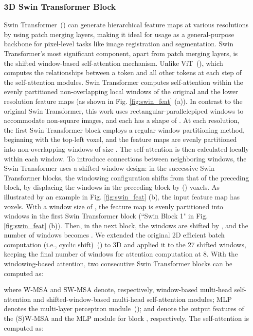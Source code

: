 \documentclass[times,twocolumn,final]{elsarticle}
\begin{document}
\subsubsection{3D Swin Transformer Block}
Swin Transformer~(\cite{liu2021swin}) can generate hierarchical feature maps at various resolutions by using patch merging layers, making it ideal for usage as a general-purpose backbone for pixel-level tasks like image registration and segmentation. Swin Transformer's most significant component, apart from patch merging layers, is the shifted window-based self-attention mechanism. Unlike ViT~(\cite{dosovitskiy2020image}), which computes the relationships between a token and all other tokens at each step of the self-attention modules. Swin Transformer computes self-attention within the evenly partitioned non-overlapping local windows of the original and the lower resolution feature maps (as shown in Fig. \ref{fig:swin_feat} (a)). In contrast to the original Swin Transformer, this work uses rectangular-parallelepiped windows to accommodate non-square images, and each has a shape of . At each resolution, the first Swin Transformer block employs a regular window partitioning method, beginning with the top-left voxel, and the feature maps are evenly partitioned into non-overlapping windows of size . The self-attention is then calculated locally within each window. To introduce connections between neighboring windows, the Swin Transformer uses a shifted window design: in the successive Swin Transformer blocks, the windowing configuration shifts from that of the preceding block, by displacing the windows in the preceding block by () voxels. As illustrated by an example in Fig. \ref{fig:swin_feat} (b), the input feature map has  voxels. With a window size of , the feature map is evenly partitioned into  windows in the first Swin Transformer block (``Swin Block 1" in Fig. \ref{fig:swin_feat} (b)). Then, in the next block, the windows are shifted by , and the number of windows becomes . We extended the original 2D efficient batch computation (i.e., cyclic shift)~(\cite{liu2021swin, liu2021video}) to 3D and applied it to the 27 shifted windows, keeping the final number of windows for attention computation at 8. With the windowing-based attention, two consecutive Swin Transformer blocks can be computed as:
\begin{linenomath}

\end{linenomath}
where W-MSA and SW-MSA denote, respectively, window-based multi-head self-attention and shifted-window-based multi-head self-attention modules; MLP denotes the multi-layer perceptron module~(\cite{vaswani2017attention});  and  denote the output features of the (S)W-MSA and the MLP module for block , respectively. The self-attention is computed as:
\end{document}
